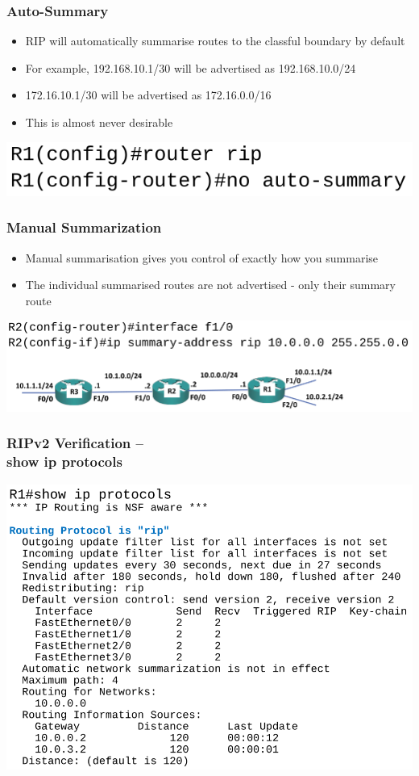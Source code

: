 \documentclass[pdflatex,compress,mathserif]{beamer}
\begin{document}
\begin{frame}
	\frametitle{Auto-Summary}
	\begin{itemize}
		\item RIP will automatically summarise routes to the classful boundary by
default
		\item For example, 192.168.10.1/30 will be advertised as 192.168.10.0/24
		\item 172.16.10.1/30 will be advertised as 172.16.0.0/16
		\item This is almost never desirable
	\end{itemize}
	\begin{center}
		\includegraphics[width=0.7\linewidth]{img/img02}
	\end{center}
\end{frame}

\begin{frame}
	\frametitle{Manual Summarization}
	\begin{itemize}
		\item Manual summarisation gives you control of exactly how you summarise
		\item The individual summarised routes are not advertised - only their summary
route
	\end{itemize}
	\begin{center}
		\includegraphics[width=\linewidth]{img/img03}
	\end{center}
\end{frame}

\begin{frame}
	\frametitle{RIPv2 Verification –\\ show ip protocols}
	\begin{center}
		\includegraphics[height=0.9\textheight]{img/img04}
	\end{center}
\end{frame}
\end{document}
